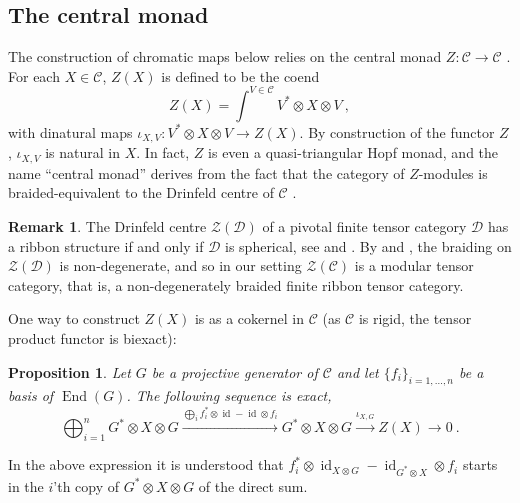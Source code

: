 \documentclass[11pt]{amsart}
\newtheorem{prop}[thm]{Proposition}
\theoremstyle{definition}
\newtheorem{remark}[thm]{Remark}
\numberwithin{equation}{section}
\def\cC{\mathcal{C}}
\def\to{\rightarrow}
\def\End{{\operatorname{End}}}
\def\id{{\operatorname{id}}}
\begin{document}
\subsection{The central monad}

The construction of chromatic maps below relies on the central monad $Z : \cC \to \cC$ \cite{BV12}. For each $X \in \cC$, $Z(X)$ is defined to be the coend 
\begin{equation}
   Z(X) = \int^{V \in \cC} 
   V^* \otimes X \otimes V \ ,
\end{equation}
with dinatural maps $\iota_{X,V} : V^*\otimes X \otimes V \to Z(X)$. By construction of the functor $Z$, $\iota_{X,V}$ is natural in $X$. In fact, $Z$ is even a quasi-triangular Hopf monad, and the name ``central monad'' derives from the fact that the category of $Z$-modules is braided-equivalent to the Drinfeld centre of $\cC$ \cite{BV12, DS07}.


\begin{remark}
The Drinfeld centre $\mathcal{Z}(\mathcal{D})$ of a pivotal finite tensor category $\mathcal{D}$ has a ribbon structure if and only if $\mathcal{D}$ is spherical, see \cite[Thm.\,5.11]{shimizu2021ribbonstructuresdrinfeldcenter} and \cite[Cor.\,2.13]{muller2024distinguishedinvertibleobjectribbon}. By \cite[Prop.\,4.4]{etingof2004analogueradfordss4formula} and \cite[Thm.\,1.1]{shimizu2016nondegeneracyconditionsbraidedfinite}, the braiding on $\mathcal{Z}(\mathcal{D})$ is non-degenerate, and so in our setting $\mathcal{Z}(\cC)$ is a modular tensor category, that is, a non-degenerately braided finite ribbon tensor category.
\end{remark}

One way to construct $Z(X)$ is as a cokernel in $\cC$ \cite[Prop.\,5.1.7]{KL01} (as $\cC$ is rigid, the tensor product functor is biexact):

\begin{prop}\label{prop:monad-coker}
    Let $G$ be a projective generator of $\cC$ and let $\{ f_i \}_{i=1,\dots,n}$ be a basis of $\End(G)$. The following sequence is exact,
$$
\bigoplus_{i=1}^n G^* \otimes X \otimes G
\xrightarrow{\bigoplus_i f_i^* \otimes \id - \id \otimes f_i}
G^* \otimes X \otimes G 
\xrightarrow{\iota_{X,G}} Z(X) 
\to 0 \ .
$$
\end{prop}

In the above expression it is understood that $f_i^* \otimes \id_{X \otimes G} - \id_{G^* \otimes X} \otimes f_i$ starts in the $i$'th copy of $G^* \otimes X \otimes G$ of the direct sum.
\end{document}
